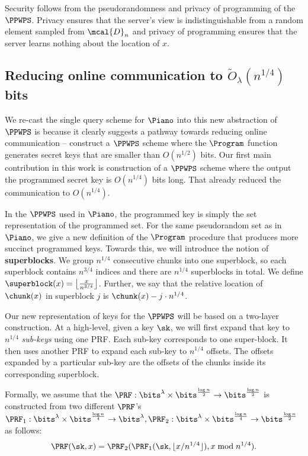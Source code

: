 Security follows from the pseudorandomness and privacy of programming of the $\PPWPS$. Privacy ensures that the server's view is indistinguishable from a random element sampled from $\mcal{D}_n$ and privacy of programming ensures that the server learns nothing about the location of $x$.

\subsection{Reducing online communication to $\widetilde{O}_\lambda(n^{1/4})$
bits}
 We re-cast the single query scheme for $\Piano$ into this new abstraction of $\PPWPS$ is because it clearly suggests a pathway towards reducing online communication -- construct a $\PPWPS$ scheme where the $\Program$ function generates secret keys that are smaller than $O(n^{1/2})$ bits. Our first main contribution in this work is construction of a $\PPWPS$ scheme where the output the programmed secret key is $O(n^{1/4})$ bits long. That already reduced the communication to $O(n^{1/4})$.

 In the $\PPWPS$ used in $\Piano$, the programmed key is simply the set representation of the programmed set. For the same pseudorandom set as in $\Piano$, we give a new definition of the $\Program$ procedure that produces more succinct programmed keys. Towards this, we will introduce the notion of {\bf
superblocks}. We group $n^{1/4}$ consecutive chunks into one superblock, so each
superblock contains $n^{3/4}$ indices and there are $n^{1/4}$ superblocks in
total. We define $\superblock(x)=\left\lfloor \frac{x}{n^{3/4}}\right\rfloor$.
Further, we say that the relative location of $\chunk(x)$ in superblock $j$ is
$\chunk(x)-j\cdot n^{1/4}$. 

Our new representation of keys for the $\PPWPS$ will be based on a two-layer construction. At a
high-level, given a key $\sk$, we will first expand that key to $n^{1/4}$
\emph{sub-keys} using one PRF. Each sub-key corresponds to one super-block. It
then uses another PRF to expand each sub-key to $n^{1/4}$ offsets. The offsets
expanded by a particular sub-key are the offsets of the chunks inside its
corresponding superblock. 

Formally, we assume that the $\PRF:\bits^{\lambda}\times \bits^{\frac{\log
n}{2}}\to \bits^{\frac{\log n}{2}}$ is constructed from two different $\PRF$'s
$\PRF_1: \bits^{\lambda}\times \bits^{\frac{\log n}{4}}\to
\bits^{\lambda},\PRF_2:\bits^{\lambda}\times \bits^{\frac{\log n}{4}}\to
\bits^{\frac{\log n}{2}}$ as follows:
\begin{align*}
    \PRF(\sk,x)=\PRF_2(\PRF_1(\sk,\lfloor x / n^{1/4} \rfloor ),x\bmod n^{1/4}).
\end{align*}

